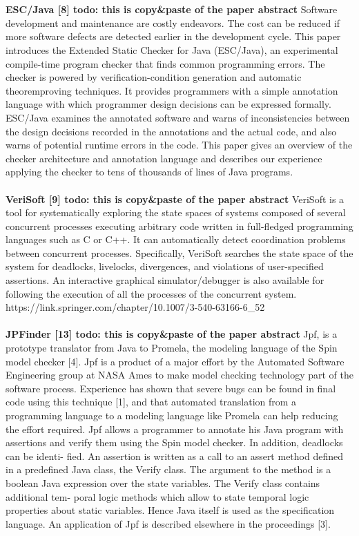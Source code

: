 \\
\\
\textbf{ESC/Java [8] todo: this is copy\&paste of the paper abstract}
Software development and maintenance are costly endeavors. The cost can be reduced if more software defects are detected earlier in the development cycle. This paper introduces the Extended Static Checker for Java (ESC/Java), an experimental compile-time program checker that finds common programming errors. The checker is powered by verification-condition generation and automatic theoremproving techniques. It provides programmers with a simple annotation language with which programmer design decisions can be expressed formally. ESC/Java examines the annotated software and warns of inconsistencies between the design decisions recorded in the annotations and the actual code, and also warns of potential runtime errors in the code. This paper gives an overview of the checker architecture and annotation language and describes our experience applying the checker to tens of thousands of lines of Java programs.
\\
\\
\textbf{VeriSoft [9] todo: this is copy\&paste of the paper abstract}
VeriSoft is a tool for systematically exploring the state spaces of systems composed of several concurrent processes executing arbitrary code written in full-fledged programming languages such as C or C++. It can automatically detect coordination problems between concurrent processes. Specifically, VeriSoft searches the state space of the system for deadlocks, livelocks, divergences, and violations of user-specified assertions. An interactive graphical simulator/debugger is also available for following the execution of all the processes of the concurrent system.
\\
https://link.springer.com/chapter/10.1007/3-540-63166-6\_52
\\
\\
\textbf{JPFinder [13] todo: this is copy\&paste of the paper abstract}
Jpf, is a prototype translator from Java to Promela, the modeling language of the Spin model checker [4]. Jpf is a product of a major effort by the Automated Software Engineering group at NASA Ames to make model checking technology part of the software process. Experience has shown that severe bugs can be found in final code using this technique [1], and that automated translation from a programming language to a modeling language like Promela can help reducing the effort required.
Jpf allows a programmer to annotate his Java program with assertions and verify them using the Spin model checker. In addition, deadlocks can be identi- fied. An assertion is written as a call to an assert method defined in a predefined Java class, the Verify class. The argument to the method is a boolean Java expression over the state variables. The Verify class contains additional tem- poral logic methods which allow to state temporal logic properties about static variables. Hence Java itself is used as the specification language. An application of Jpf is described elsewhere in the proceedings [3].
